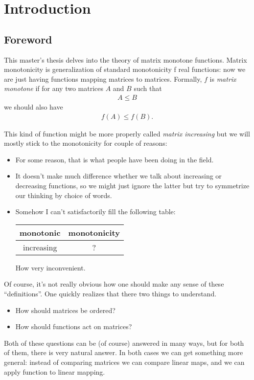 \chapter{Introduction}

\section{Foreword}

This master's thesis delves into the theory of matrix monotone functions. Matrix monotonicity is generalization of standard monotonicity f real functions: now we are just having functions mapping matrices to matrices. Formally, $f$ is \textit{matrix monotone} if for any two matrices $A$ and $B$ such that
\begin{align}
	A \leq B
\end{align}
we should also have
\begin{align}
	f(A) \leq f(B).
\end{align}

This kind of function might be more properly called \textit{matrix increasing} but we will mostly stick to the monotonicity for couple of reasons:
\begin{itemize}
	\item For some reason, that is what people have been doing in the field.
	\item It doesn't make much difference whether we talk about increasing or decreasing functions, so we might just ignore the latter but try to symmetrize our thinking by choice of words.
	\item Somehow I can't satisfactorily fill the following table:
	\begin{center}
	\begin{tabular}{| c | c |}
		\hline
		monotonic & monotonicity \\
		\hline
		increasing & ? \\
		\hline
	\end{tabular}
	\end{center}
	How very inconvenient.
\end{itemize}

Of course, it's not really obvious how one should make any sense of these ``definitions''. One quickly realizes that there two things to understand.
\begin{itemize}
	\item How should matrices be ordered?
	\item How should functions act on matrices?
\end{itemize}
Both of these questions can be (of course) answered in many ways, but for both of them, there is very natural answer. In both cases we can get something more general: instead of comparing matrices we can compare linear maps, and we can apply function to linear mapping.


